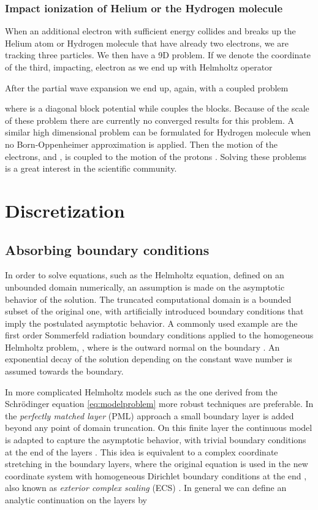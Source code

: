 \documentclass[mathpazo]{cicp}
\theoremstyle{definition}
\numberwithin{equation}{section}
\providecommand{\wv}{}
\begin{document}
\subsubsection{Impact ionization of Helium or the Hydrogen molecule}\label{sec:impactionisation}
  When an \wv{additional} electron with sufficient energy collides and breaks up the
  Helium atom or Hydrogen molecule \wv{that have already two electrons, we are tracking three particles}. We then have a 9D problem.
  If we denote the coordinate of the third, impacting, electron as
   we end up with Helmholtz operator

After \wv{the partial wave expansion} we end up, again, with a coupled problem 

where  is a diagonal block potential while
 couples the blocks.  Because of the scale of
these problem there are currently no converged results for this
problem.  A similar high dimensional problem can be formulated for
Hydrogen molecule when no Born-Oppenheimer approximation is applied.
Then the motion of the electrons,  and
, is coupled to the motion of the protons
.  \wv{Solving these problems is a great interest in the
scientific community.}

\section{Discretization}\label{sec:discretize}
\subsection{Absorbing boundary conditions}
In order to solve equations, such as the Helmholtz equation, defined on an unbounded domain  numerically, an assumption is made on the asymptotic behavior of the solution. The truncated computational domain is a bounded subset  of the original one, with artificially introduced boundary conditions that imply the postulated asymptotic behavior. A commonly used example are the first order Sommerfeld radiation boundary conditions applied to the homogeneous Helmholtz problem, , where  is the outward normal on the boundary . An exponential decay of the solution depending on the constant wave number  is assumed towards the boundary.

In more complicated Helmholtz models such as the one derived from the Schr\"odinger equation \eqref{eq:modelproblem} more robust techniques are preferable. In the \emph{perfectly matched layer} (PML) approach \cite{B94} a small boundary layer  is added beyond any point of domain truncation. On this finite layer the continuous model is adapted to capture the asymptotic behavior, with trivial boundary conditions at the end of the layers . This idea is equivalent to a complex coordinate stretching \cite{CW94,R95,TC98} in the boundary layers, where the original equation is used in the new coordinate system  with homogeneous Dirichlet boundary conditions at the end , also known as \emph{exterior complex scaling} (ECS) \cite{NB78,S79}. In general we can define an analytic continuation on the layers by
\end{document}
